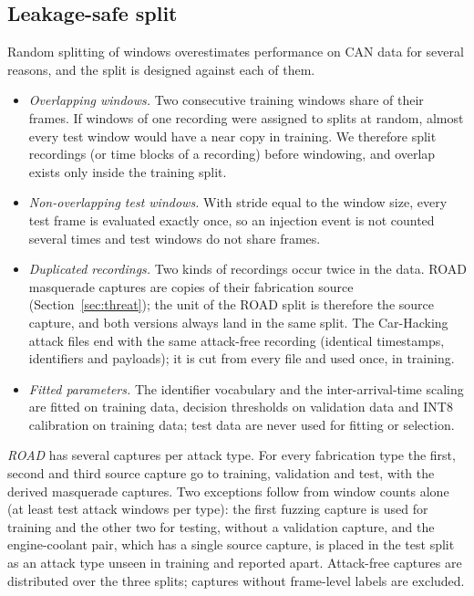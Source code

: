 \subsection{Leakage-safe split}
Random splitting of windows overestimates performance on CAN data for several reasons, and the split is designed
against each of them.
\begin{itemize}
\item \emph{Overlapping windows.} Two consecutive training windows share \OverlapTrainPct{} of their frames. If
windows of one recording were assigned to splits at random, almost every test window would have a near copy in
training. We therefore split recordings (or time blocks of a recording) before windowing, and overlap exists only
inside the training split.
\item \emph{Non-overlapping test windows.} With stride equal to the window size, every test frame is evaluated
exactly once, so an injection event is not counted several times and test windows do not share frames.
\item \emph{Duplicated recordings.} Two kinds of recordings occur twice in the data. ROAD masquerade captures are
copies of their fabrication source (Section~\ref{sec:threat}); the unit of the ROAD split is therefore the source
capture, and both versions always land in the same split. The \SharedTailFiles{} Car-Hacking attack files end with
the same attack-free recording (identical timestamps, identifiers and payloads); it is cut from every file and used
once, in training.
\item \emph{Fitted parameters.} The identifier vocabulary and the inter-arrival-time scaling are fitted on training
data, decision thresholds on validation data and INT8 calibration on training data; test data are never used for
fitting or selection.
\end{itemize}

\emph{ROAD} has several captures per attack type. For every fabrication type the first, second and third source
capture go to training, validation and test, with the derived masquerade captures. Two exceptions follow from
window counts alone (at least \MinTestAttackWindows{} test attack windows per type): the first fuzzing capture is
used for training and the other two for testing, without a validation capture, and the engine-coolant pair, which
has a single source capture, is placed in the test split as an attack type unseen in training and reported apart.
Attack-free captures are distributed over the three splits; \ExcludedROAD{} captures without frame-level labels
are excluded.

